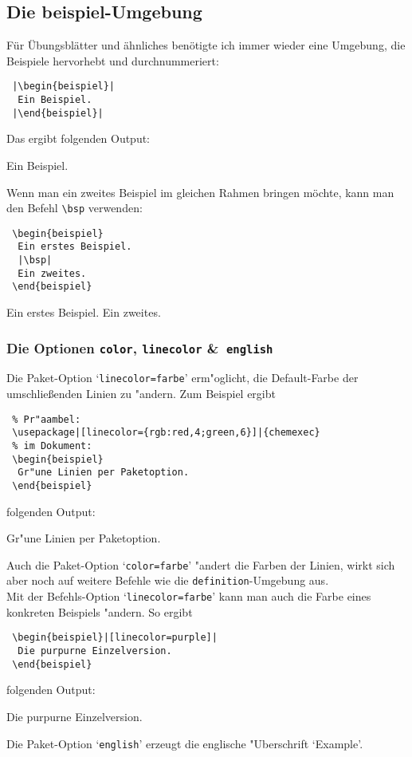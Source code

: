 \documentclass[a4paper,10pt,headsepline]{scrartcl}
\newcommand{\option}[1]{`\texttt{#1}'\xspace}
\begin{document}
\subsection{Die {\ttfamily beispiel}-Umgebung}\label{subsec:beispiele}
F\"ur \"Ubungsbl\"atter und \"ahnliches ben\"otigte ich immer wieder eine Umgebung, die Beispiele hervorhebt und durchnummeriert:
\begin{lstlisting}
 |\begin{beispiel}|
  Ein Beispiel.
 |\end{beispiel}|
\end{lstlisting}
Das ergibt folgenden Output:
\begin{beispiel}
 Ein Beispiel.
\end{beispiel}
\noindent Wenn man ein zweites Beispiel im gleichen Rahmen bringen m\"ochte, kann man den Befehl \verb=\bsp=
verwenden:
\begin{lstlisting}
 \begin{beispiel}
  Ein erstes Beispiel.
  |\bsp|
  Ein zweites.
 \end{beispiel}
\end{lstlisting}
\begin{beispiel}
 Ein erstes Beispiel.
 \bsp
 Ein zweites.
\end{beispiel}

\subsubsection{Die Optionen \texttt{color}, \texttt{linecolor} \&\ \texttt{english}}
Die Paket-Option \option{linecolor=farbe} erm"oglicht, die Default-Farbe der umschlie\ss enden Linien zu "andern. Zum Beispiel ergibt
\begin{lstlisting}
 % Pr"aambel:
 \usepackage|[linecolor={rgb:red,4;green,6}]|{chemexec}
 % im Dokument:
 \begin{beispiel}
  Gr"une Linien per Paketoption.
 \end{beispiel}
\end{lstlisting}
folgenden Output:
\begin{beispiel}[linecolor={rgb:red,4;green,6}]
 Gr"une Linien per Paketoption.
\end{beispiel}
\noindent Auch die Paket-Option \option{color=farbe} "andert die Farben der Linien, wirkt sich aber noch auf weitere Befehle wie die \texttt{definition}-Umgebung aus.\\
Mit der Befehls-Option \option{linecolor=farbe} kann man auch die Farbe eines konkreten Beispiels "andern. So ergibt
\begin{lstlisting}
 \begin{beispiel}|[linecolor=purple]|
  Die purpurne Einzelversion.
 \end{beispiel}
\end{lstlisting}
folgenden Output:
\begin{beispiel}[linecolor=purple]
 Die purpurne Einzelversion.
\end{beispiel}
\noindent Die Paket-Option \option{english} erzeugt die englische "Uberschrift `Example'.
\end{document}
